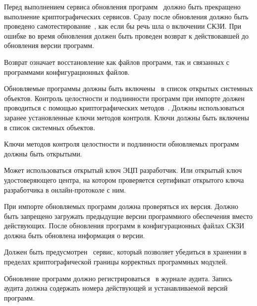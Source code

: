 \label{R.SU.Logic} %
Перед выполнением сервиса обновления программ~ 
должно быть прекращено выполнение криптографических сервисов. 
%
Сразу после обновления должно быть проведено 
самотестирование~, 
как если бы речь шла о включении СКЗИ.
%
При ошибке во время обновления должен быть проведен
возврат к действовавшей до обновления версии программ. 

\begin{note}
Возврат означает восстановление как файлов программ, так и связанных с 
программами конфигурационных файлов. 
\end{note}

\label{R.SU.Import} %
Обновляемые программы должны быть включены~ в список
открытых системных объектов. Контроль целостности и подлинности программ при
импорте должен проводиться с помощью криптографических
методов~. Должны использоваться заранее установленные ключи
методов контроля. Ключи должны быть включены~ в список
системных объектов.

\label{R.SU.Sig} %
Ключи методов контроля целостности и подлинности обновляемых программ должны 
быть открытыми. 

\begin{note}
Может использоваться открытый ключ ЭЦП разработчик. Или открытый ключ
удостоверяющего центра, на котором проверяется сертификат открытого ключа
разработчика в онлайн-протоколе с ним.
\end{note}

\label{R.SU.Version} %
При импорте обновляемых программ должна проверяться их версия.
Должно быть запрещено загружать предыдущие версии программного обеспечения 
вместо действующих. После обновления программ в конфигурационных файлах СКЗИ
должна быть обновлена информация о версии.

\label{R.SU.PoS} %
Должен быть предусмотрен~ сервис, который позволяет убедиться
в хранении в пределах криптографической границы корректных программных модулей.

\label{R.SU.AU} %
Обновление программ должно регистрироваться~ в журнале
аудита.
%
Запись аудита должна содержать номера действующей и устанавливаемой версий
программ.

